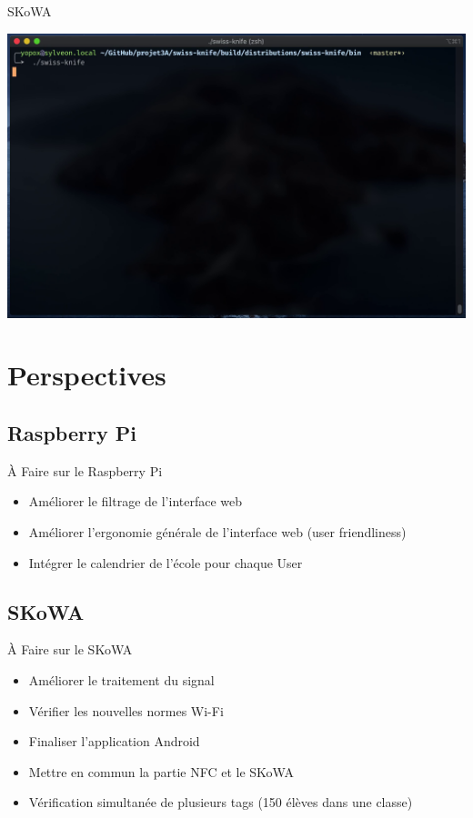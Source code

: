 \documentclass[aspectratio=169]{beamer}
\begin{document}
\begin{frame}{SKoWA}
  \begin{minipage}{.6\textwidth}
    \centering
    \includegraphics[width=\textwidth]{../assets/skowa-reader}
  \end{minipage}
\end{frame}

\section{Perspectives}

\subsection{Raspberry Pi}

\begin{frame}{À Faire sur le Raspberry Pi}

  \begin{itemize}
    \item Améliorer le filtrage de l'interface web
    \item Améliorer l'ergonomie générale de l'interface web (user friendliness)
    \item Intégrer le calendrier de l'école pour chaque User
  \end{itemize}  

\end{frame}

\subsection{SKoWA}

\begin{frame}{À Faire sur le SKoWA}

  \begin{itemize}
    \item Améliorer le traitement du signal
    \item Vérifier les nouvelles normes Wi-Fi
    \item Finaliser l'application Android
    \item Mettre en commun la partie NFC et le SKoWA
    \item Vérification simultanée de plusieurs tags (150 élèves dans une classe)
  \end{itemize}  

\end{frame}
\end{document}
